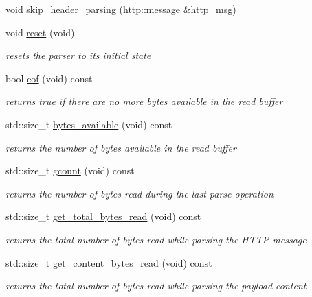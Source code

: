 \begin{DoxyCompactItemize}
void \hyperlink{classpion_1_1http_1_1parser_a0fb8ebee189b4c3613ee67c85e2ac9ce}{skip\-\_\-header\-\_\-parsing} (\hyperlink{classpion_1_1http_1_1message}{http\-::message} \&http\-\_\-msg)
\item 
void \hyperlink{classpion_1_1http_1_1parser_aed8cfd92c078205e38294bd8109eb2d3}{reset} (void)
\begin{DoxyCompactList}\small\item\em resets the parser to its initial state \end{DoxyCompactList}\item 
bool \hyperlink{classpion_1_1http_1_1parser_adf957476284a4833ea89306e412b1862}{eof} (void) const 
\begin{DoxyCompactList}\small\item\em returns true if there are no more bytes available in the read buffer \end{DoxyCompactList}\item 
std\-::size\-\_\-t \hyperlink{classpion_1_1http_1_1parser_a4e8f394a1c2296ac01d2c16c5128b7b4}{bytes\-\_\-available} (void) const 
\begin{DoxyCompactList}\small\item\em returns the number of bytes available in the read buffer \end{DoxyCompactList}\item 
std\-::size\-\_\-t \hyperlink{classpion_1_1http_1_1parser_ad708d537fabbc3093ea0ea9a519567dc}{gcount} (void) const 
\begin{DoxyCompactList}\small\item\em returns the number of bytes read during the last parse operation \end{DoxyCompactList}\item 
std\-::size\-\_\-t \hyperlink{classpion_1_1http_1_1parser_ae458700259bab34f090832c3bc23ab80}{get\-\_\-total\-\_\-bytes\-\_\-read} (void) const 
\begin{DoxyCompactList}\small\item\em returns the total number of bytes read while parsing the H\-T\-T\-P message \end{DoxyCompactList}\item 
std\-::size\-\_\-t \hyperlink{classpion_1_1http_1_1parser_ab0ca19c444c2d3cf816347422b1c5402}{get\-\_\-content\-\_\-bytes\-\_\-read} (void) const 
\begin{DoxyCompactList}\small\item\em returns the total number of bytes read while parsing the payload content \end{DoxyCompactList}\item 

\end{DoxyCompactItemize}
